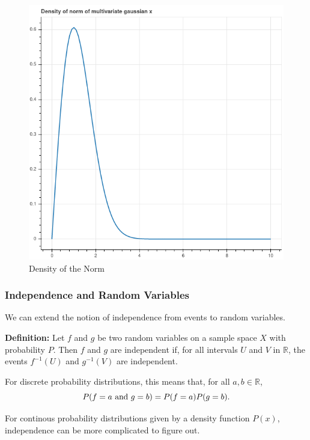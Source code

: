 \documentclass[
]{article}
\begin{document}
\begin{figure}
\hypertarget{fig:maxwell}{%
\centering
\includegraphics{../img/maxwell.png}
\caption{Density of the Norm}\label{fig:maxwell}
}
\end{figure}

\hypertarget{independence-and-random-variables}{%
\subsubsection{Independence and Random
Variables}\label{independence-and-random-variables}}

We can extend the notion of independence from events to random
variables.

\textbf{Definition:} Let \(f\) and \(g\) be two random variables on a
sample space \(X\) with probability \(P\). Then \(f\) and \(g\) are
independent if, for all intervals \(U\) and \(V\) in \(\mathbb{R}\), the
events \(f^{-1}(U)\) and \(g^{-1}(V)\) are independent.

For discrete probability distributions, this means that, for all
\(a,b\in\mathbb{R}\), \[
P(f=a\hbox{\rm\ and\ }g=b)=P(f=a)P(g=b).
\]

For continous probability distributions given by a density function
\(P(x)\), independence can be more complicated to figure out.
\end{document}

